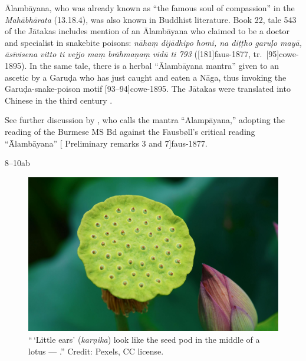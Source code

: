 \begin{translation}
{Ālambāyana, who was already known as “the famous soul of compassion”
in the \emph{Mahābhārata} (13.18.4), was also known in Buddhist
literature. Book 22, tale 543 of the Jātakas includes mention of
an Ālambāyana who claimed to be a doctor and specialist in
snakebite poisons: \emph{nāhaṃ dijādhipo homi, na diṭṭho garuḷo
mayā, āsīvisena vitto ti vejjo maṃ brāhmaṇaṃ vidū ti 793}
([181]{faus-1877}, tr.\  [95]{cowe-1895}).
In the same tale, there is a herbal “Ālambāyana mantra” given to
an ascetic by a Garuḍa who has just caught and eaten a Nāga, thus
invoking the Garuḍa-snake-poison motif
[93--94]{cowe-1895}.  The Jātakas were translated
into Chinese in the third century \CE.
    
    See further discussion by \citet[33--34]{slou-2016}, who calls
    the mantra “Alampāyana,” adopting the reading of the Burmese MS
    Bd against the Fausbøll's critical reading  “Ālambāyana” 
    [ Preliminary remarks 3 and 7]{faus-1877}.}
    
\item[8--10ab]

\begin{figure}
    \centering
    \includegraphics[width=0.7\linewidth]{media/lotusbud}
    \caption{“\,`Little ears' (\emph{karṇika}) look like the seed pod in the middle 
    of a lotus --- .” Credit: Pexels, CC license.}
    \label{fig:lotusbud}
\end{figure}


\end{translation}
